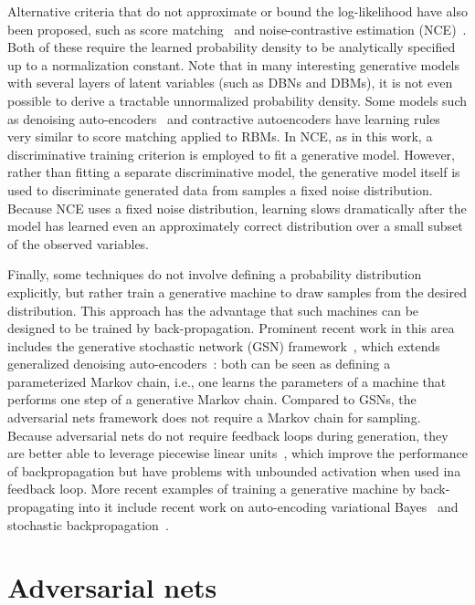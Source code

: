 \documentclass{article}
\begin{document}
Alternative criteria that do not approximate or bound
the log-likelihood have also been proposed, such as score matching~\citep{Hyvarinen-2005-small}
and noise-contrastive estimation (NCE)~\citep{Gutmann+Hyvarinen-2010-small}.
Both of these require the learned probability density to be analytically specified
up to a normalization constant. Note that in many interesting generative models with several
layers of latent variables (such as
DBNs and DBMs), it is not even possible to derive a tractable unnormalized probability density.
Some models such as denoising auto-encoders~\citep{VincentPLarochelleH2008-small} and contractive
autoencoders have learning rules very similar to score matching applied to RBMs.
In NCE, as in this work, a discriminative training criterion is
employed to fit a generative model. However, rather than fitting a separate discriminative
model, the generative model itself is used to discriminate generated data from samples
a fixed noise distribution. Because NCE uses a fixed noise distribution, learning slows
dramatically after the model has learned even an approximately correct distribution over
a small subset of the observed variables.

Finally, some techniques do not involve defining a probability distribution explicitly,
but rather train a generative machine to draw samples from the desired distribution.
This approach has the advantage that such machines can be designed to be trained by
back-propagation. Prominent recent work in this area includes the generative stochastic network
(GSN) framework~\citep{Bengio-et-al-ICML2014}, which extends generalized denoising
auto-encoders~\citep{Bengio-et-al-NIPS2013}: both can be seen as defining a
parameterized Markov chain, i.e., one learns the parameters of a machine that
performs one step of a generative Markov chain.
Compared to GSNs, the adversarial nets framework does not require a Markov chain for
sampling. Because adversarial nets do not require feedback loops during generation,
they are better able to leverage piecewise linear
units~\cite{Jarrett-ICCV2009,Glorot+al-AI-2011-small,Goodfellow_maxout_2013},
which improve the performance of backpropagation but have problems with unbounded activation when used ina feedback loop.
More recent examples of training a generative machine by back-propagating into it
include recent work on auto-encoding variational Bayes~\citep{Kingma+Welling-ICLR2014} 
and stochastic backpropagation~\citep{Rezende-et-al-arxiv2014}.

\section{Adversarial nets}
\end{document}
